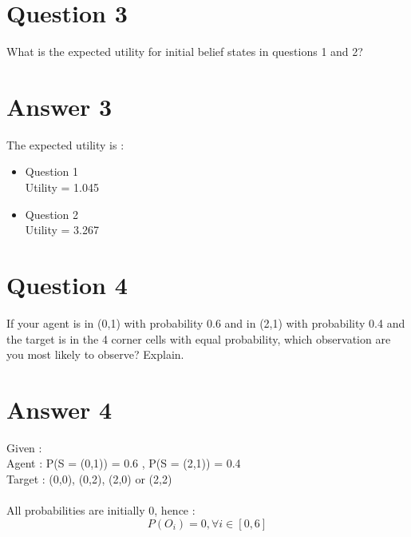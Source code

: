 \documentclass[10pt,letterpaper]{article}
\begin{document}
\section*{Question 3}
What is the expected utility for initial belief states in questions 1 and 2?
\section*{Answer 3}
The expected utility is :
\begin{itemize}
    \item Question 1\\ \hspace*{23pt} Utility = 1.045
    \item Question 2\\ \hspace*{23pt} Utility = 3.267
\end{itemize}

\section*{Question 4}
If your agent is in (0,1) with probability 0.6 and in (2,1) with probability 0.4
and the target is in the 4 corner cells with equal probability, which
observation are you most likely to observe? Explain.
\section*{Answer 4}
Given : \\
\hspace*{23pt} Agent : P(S = (0,1)) = 0.6 , P(S = (2,1)) = 0.4\\
\hspace*{23pt} Target : (0,0), (0,2), (2,0) or (2,2)
\\\\
All probabilities are initially 0, hence :
\begin{equation*}
    P(O_i) = 0, \forall i \in [0,6]
\end{equation*}
\end{document}
